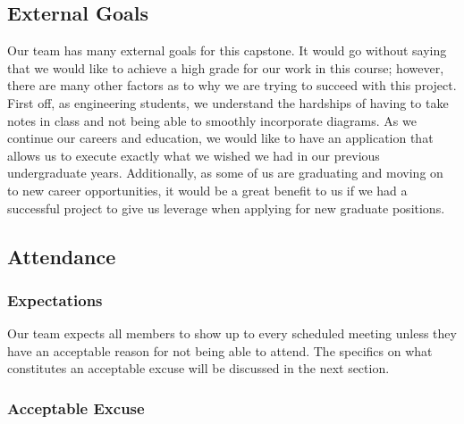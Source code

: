 \documentclass{article}
\begin{document}

\subsection*{External Goals}


Our team has many external goals for this capstone. It would go without saying that we would like to achieve a high grade for our work in this course; however, there are many other factors as to why we are trying to succeed with this project. First off, as engineering students, we understand the hardships of having to take notes in class and not being able to smoothly incorporate diagrams. As we continue our careers and education, we would like to have an application that allows us to execute exactly what we wished we had in our previous undergraduate years.
Additionally, as some of us are graduating and moving on to new career opportunities, it would be a great benefit to us if we had a successful project to give us leverage when applying for new graduate positions. 


\subsection*{Attendance}

\subsubsection*{Expectations}


Our team expects all members to show up to every scheduled meeting unless they have an acceptable reason for not being able to attend. The specifics on what constitutes an acceptable excuse will be discussed in the next section.

\subsubsection*{Acceptable Excuse}
\end{document}
